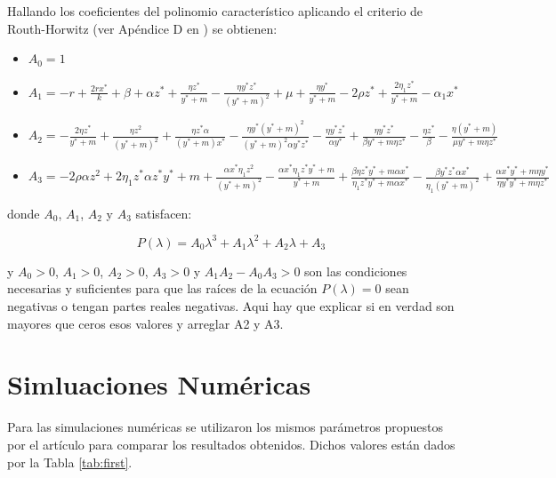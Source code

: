 \documentclass{wscpaperproc}
\theoremstyle{wsc}
\begin{document}
Hallando los coeficientes del polinomio característico aplicando el criterio de Routh-Horwitz (ver Apéndice D en \cite{castellanos_existence_2017}) se obtienen:

	
\begin{itemize}
	\item[] $A_0 = 1$
	
	\item[] $A_1 = -r + \frac{2rx^*}{k} + \beta + \alpha z^*  + \frac{\eta z^*}{y^*+m} - \frac{\eta y^*z^*}{(y^*+m)^2} + \mu + \frac{\eta y^*}{y^*+m} - 2 \rho z^* + \frac{2\eta_1 z^*}{y^*+m} - \alpha_1 x^*$
	
	\item[] $A_{2} = -\frac{2\eta z^*}{y^*+m} + \frac{\eta z^{2}}{(y^*+m)^{2}} + \frac{\eta z^* \alpha}{(y^*+m) x^*} - \frac{\eta y^*(y^*+m)^{2}}{(y^*+m)^{2}\alpha y^*z^*} - \frac{\eta y^*z^*}{\alpha y^*} + \frac{\eta y^*z^*}{\beta y^*+m\eta z^*} - \frac{\eta z^*}{\beta} - \frac{\eta(y^*+m)}{\mu y^*+m\eta z^*}$
	
	\item[] $A_{3} = -2\rho\alpha z^{2} + 2\eta_{1} z^*\alpha z^*y^*+m + \frac{\alpha x^*\eta_{1} z^{2}}{(y^*+m)^{2}} - \frac{\alpha x^*\eta_{1} z^*y^*+m}{y^*+m} + \frac{\beta\eta z^*y^*+m\alpha x^*}{\eta_{1} z^*y^*+m\alpha x^*} - \frac{\beta y^*z^*\alpha x^*}{\eta_{1} (y^*+m)^{2}} + \frac{\alpha x^*y^*+m\eta y^*}{\eta y^*y^*+m\eta z^*}$
\end{itemize}
donde $A_0$, $A_1$, $A_2$  y $A_3$ satisfacen:

$$P(\lambda) = A_0\lambda^3 + A_1\lambda^2 + A_2\lambda + A_3$$

y $A_0 > 0$, $A_1 > 0$, $A_2 > 0$, $A_3 > 0$ y $A_1 A_2 - A_0 A_3 > 0$ son las condiciones necesarias y suficientes 
para que las raíces de la ecuación $P(\lambda) = 0$ sean negativas o tengan partes reales negativas. Aqui hay que explicar si en verdad 
son mayores que ceros esos valores y arreglar A2 y A3.

\section{Simluaciones Numéricas}
Para las simulaciones numéricas se utilizaron los mismos parámetros propuestos por el artículo para comparar los resultados obtenidos. 
Dichos valores están dados por la Tabla \ref{tab:first}.
\end{document}
